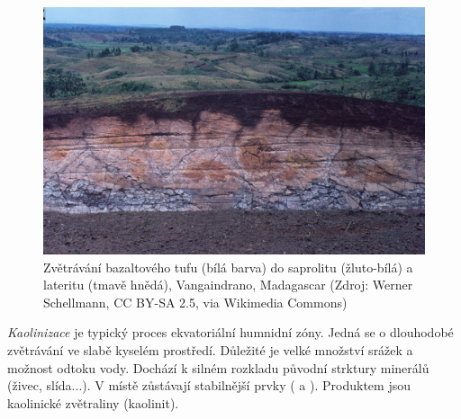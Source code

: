 \begin{figure}[h]
	\centering
	\includegraphics[width=1\linewidth]{obrazky/zvetravani/laterit}
	\caption{Zvětrávání bazaltového tufu (bílá barva) do saprolitu (žluto-bílá) a lateritu (tmavě hnědá), Vangaindrano, Madagascar (Zdroj: Werner Schellmann, CC BY-SA 2.5, via Wikimedia Commons)}
	\label{fig:laterit}
\end{figure}


\emph{Kaolinizace} je typický proces ekvatoriální humnidní zóny. Jedná se o dlouhodobé zvětrávání ve slabě kyselém prostředí. Důležité je velké množství srážek a možnost odtoku vody. Dochází k silném rozkladu původní strktury minerálů (živec, slída...). V místě zůstávají stabilnější prvky ( a ). Produktem jsou kaolinické zvětraliny (kaolinit).
%
%
%




